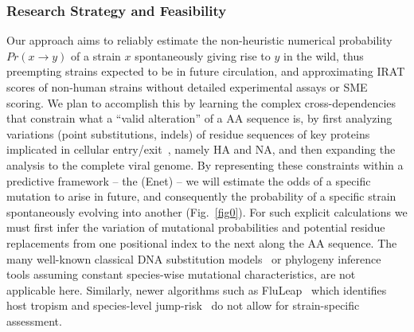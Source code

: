 \documentclass[onecolumn, compsoc,12pt]{IEEEtran}
\begin{document}
\begin{figure}[t]
  \vspace{-15pt}

  \label{fig1}

  \vspace{-20pt}

  
\end{figure}
\subsubsection*{Research Strategy and Feasibility} %
Our approach aims  to reliably   estimate the non-heuristic numerical probability $Pr(x \rightarrow y)$ of a strain $x$ spontaneously giving rise to  $y$ in the wild, thus preempting  strains  expected to be in future circulation, and approximating IRAT scores of non-human strains without detailed  experimental assays or SME scoring. We plan to accomplish this by learning the complex cross-dependencies that constrain what a ``valid alteration'' of a AA sequence is, by first  analyzing  variations (point substitutions, indels) of   residue  sequences  of key proteins implicated  in cellular entry/exit~\cite{gamblin2010influenza,shao2017evolution}, namely HA and NA, and then expanding the analysis to the complete viral genome. By representing these constraints within a predictive framework -- the \enet (Enet) -- we will  estimate the  odds of a specific mutation to arise in future, and consequently the probability of a specific strain spontaneously  evolving into another (Fig.~\ref{fig0}). For such explicit calculations we must first infer the variation of mutational probabilities and  potential residue replacements from one positional index to the next along the AA sequence. The many well-known classical  DNA  substitution models~\cite{posada1998modeltest} or  phylogeny inference tools  assuming constant species-wise mutational characteristics,  are not applicable here. Similarly, newer algorithms such  as FluLeap~\cite{eng2014predicting}  which identifies host tropism and  species-level jump-risk~\cite{grange2021ranking} do not allow for strain-specific assessment.
\end{document}
